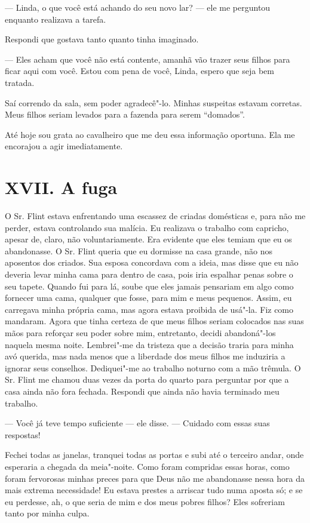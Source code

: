 --- Linda, o que você está achando do seu novo lar? --- ele me perguntou
enquanto realizava a tarefa.

Respondi que gostava tanto quanto tinha imaginado.

--- Eles acham que você não está contente, amanhã vão trazer seus filhos
para ficar aqui com você. Estou com pena de você, Linda, espero que seja
bem tratada.

Saí correndo da sala, sem poder agradecê"-lo. Minhas suspeitas estavam
corretas. Meus filhos seriam levados para a fazenda para serem
``domados''.

Até hoje sou grata ao cavalheiro que me
deu essa informação oportuna. Ela me encorajou a agir imediatamente.

\chapter{XVII. A fuga}

O Sr. Flint estava enfrentando uma
escassez de criadas domésticas e, para não me perder, estava controlando
sua malícia. Eu realizava o trabalho com capricho, apesar de, claro, não
voluntariamente. Era evidente que eles temiam que eu os abandonasse. O
Sr. Flint queria que eu dormisse na casa grande, não nos aposentos dos
criados. Sua esposa concordava com a ideia, mas disse que eu não deveria
levar minha cama para dentro de casa, pois iria espalhar penas sobre o
seu tapete. Quando fui para lá, soube que eles jamais pensariam em algo
como fornecer uma cama, qualquer que fosse, para mim e meus pequenos.
Assim, eu carregava minha própria cama, mas agora estava proibida de
usá"-la. Fiz como mandaram. Agora que tinha certeza de que meus filhos
seriam colocados nas suas mãos para reforçar seu poder sobre mim,
entretanto, decidi abandoná"-los naquela mesma noite. Lembrei"-me da
tristeza que a decisão traria para minha avó querida, mas nada menos que
a liberdade dos meus filhos me induziria a ignorar seus conselhos.
Dediquei"-me ao trabalho noturno com a mão trêmula. O Sr. Flint me chamou
duas vezes da porta do quarto para perguntar por que a casa ainda não
fora fechada. Respondi que ainda não havia terminado meu trabalho.

--- Você já teve tempo suficiente --- ele disse. --- Cuidado com essas
suas respostas!

Fechei todas as janelas, tranquei todas
as portas e subi até o terceiro andar, onde esperaria a chegada da
meia"-noite. Como foram compridas essas horas, como foram fervorosas
minhas preces para que Deus não me abandonasse nessa hora da mais
extrema necessidade! Eu estava prestes a arriscar tudo numa aposta só; e
se eu perdesse, ah, o que seria de mim e dos meus pobres filhos? Eles
sofreriam tanto por minha culpa.

